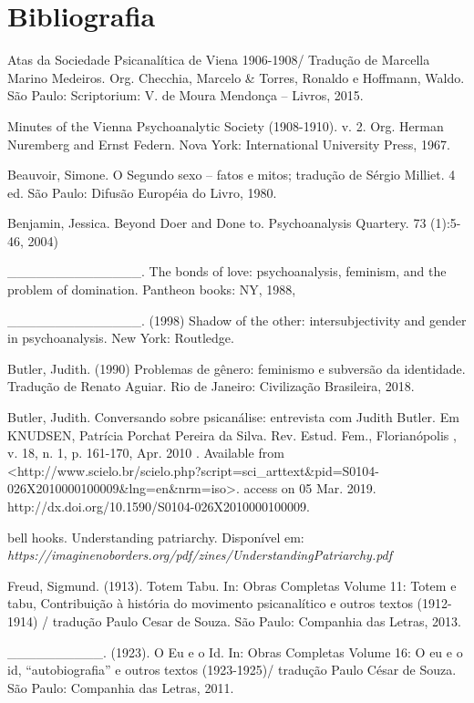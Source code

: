 \section{Bibliografia}

Atas da Sociedade Psicanalítica de Viena 1906-1908/ Tradução de Marcella
Marino Medeiros. Org. Checchia, Marcelo \& Torres, Ronaldo e Hoffmann,
Waldo. São Paulo: Scriptorium: V. de Moura Mendonça -- Livros, 2015.

Minutes of the Vienna Psychoanalytic Society (1908-1910). v. 2. Org.
Herman Nuremberg and Ernst Federn. Nova York: International University
Press, 1967.

Beauvoir, Simone. O Segundo sexo -- fatos e mitos; tradução de Sérgio
Milliet. 4 ed. São Paulo: Difusão Européia do Livro, 1980.

Benjamin, Jessica. Beyond Doer and Done to. Psychoanalysis Quartery. 73
(1):5-46, 2004)

\_\_\_\_\_\_\_\_\_\_\_\_\_\_. The bonds of love: psychoanalysis,
feminism, and the problem of domination. Pantheon books: NY, 1988,

\_\_\_\_\_\_\_\_\_\_\_\_\_\_. (1998) Shadow of the other:
intersubjectivity and gender in psychoanalysis. New York: Routledge.

Butler, Judith. (1990) Problemas de gênero: feminismo e subversão da
identidade. Tradução de Renato Aguiar. Rio de Janeiro: Civilização
Brasileira, 2018.

Butler, Judith. Conversando sobre psicanálise: entrevista com Judith
Butler. Em KNUDSEN, Patrícia Porchat Pereira da Silva. Rev. Estud. Fem.,
Florianópolis , v. 18, n. 1, p. 161-170, Apr. 2010 . Available from
\textless{}http://www.scielo.br/scielo.php?script=sci\_arttext\&pid=S0104-026X2010000100009\&lng=en\&nrm=iso\textgreater{}.
access on 05 Mar. 2019.
http://dx.doi.org/10.1590/S0104-026X2010000100009.

bell hooks. Understanding patriarchy. Disponível
em: \emph{https://imaginenoborders.org/pdf/zines/UnderstandingPatriarchy.pdf}

Freud, Sigmund. (1913). Totem Tabu. In: Obras Completas Volume 11: Totem
e tabu, Contribuição à história do movimento psicanalítico e outros
textos (1912-1914) / tradução Paulo Cesar de Souza. São Paulo: Companhia
das Letras, 2013.

\_\_\_\_\_\_\_\_\_\_. (1923). O Eu e o Id. In: Obras Completas Volume
16: O eu e o id, ``autobiografia'' e outros textos (1923-1925)/ tradução
Paulo César de Souza. São Paulo: Companhia das Letras, 2011.

